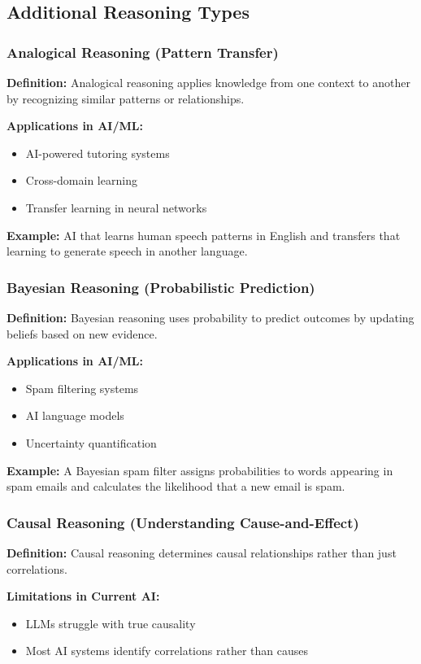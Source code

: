 \subsection{Additional Reasoning Types}

\subsubsection{Analogical Reasoning (Pattern Transfer)}
\textbf{Definition:} Analogical reasoning applies knowledge from one context to another by recognizing similar patterns or relationships.

\textbf{Applications in AI/ML:}
\begin{itemize}
    \item AI-powered tutoring systems
    \item Cross-domain learning
    \item Transfer learning in neural networks
\end{itemize}

\textbf{Example:} AI that learns human speech patterns in English and transfers that learning to generate speech in another language.

\subsubsection{Bayesian Reasoning (Probabilistic Prediction)}
\textbf{Definition:} Bayesian reasoning uses probability to predict outcomes by updating beliefs based on new evidence.

\textbf{Applications in AI/ML:}
\begin{itemize}
    \item Spam filtering systems
    \item AI language models
    \item Uncertainty quantification
\end{itemize}

\textbf{Example:} A Bayesian spam filter assigns probabilities to words appearing in spam emails and calculates the likelihood that a new email is spam.

\subsubsection{Causal Reasoning (Understanding Cause-and-Effect)}
\textbf{Definition:} Causal reasoning determines causal relationships rather than just correlations.

\textbf{Limitations in Current AI:}
\begin{itemize}
    \item LLMs struggle with true causality
    \item Most AI systems identify correlations rather than causes
\end{itemize}

